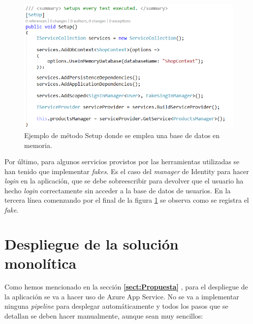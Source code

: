 \documentclass[11pt,spanish,listoffigures]{tfgetsinf}
\begin{document}
\begin{figure}[h]
\centering
\includegraphics[scale=0.8]{SetupTest}
\caption{Ejemplo de método Setup donde se emplea una base de datos en memoria.}
\label{fig:SetupTest}
\end{figure}

Por último, para algunos servicios provistos por las herramientas utilizadas se han tenido que implementar \textit{fakes}. Es el caso del \textit{manager} de Identity para hacer \textit{login} en la aplicación, que se debe sobreescribir para devolver que el usuario ha hecho \textit{login} correctamente sin acceder a la base de datos de usuarios. En la tercera línea comenzando por el final de la figura \ref{fig:SetupTest} se observa como se registra el \textit{fake}.

\section{Despliegue de la solución monolítica}

Como hemos mencionado en la sección \textbf{\ref{sect:Propuesta} }, para el despliegue de la aplicación se va a hacer uso de Azure App Service. No se va a implementar ninguna \textit{pipeline} para desplegar automáticamente y todos los pasos que se detallan se deben hacer manualmente, aunque sean muy sencillos:
\end{document}
